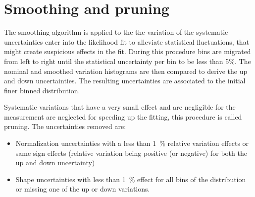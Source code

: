 \section{Smoothing and pruning}
The smoothing algorithm is applied to the the variation of the systematic uncertainties enter into the likelihood fit to alleviate statistical fluctuations, that might create suspicious effects in the fit.
During this procedure bins are migrated from left to right until the statistical uncertainty per bin to be less than 5$\%$. The nominal and smoothed variation histograms are then compared to derive the up and down uncertainties. The resulting uncertainties are associated to the initial finer binned distribution. 

Systematic variations that have a very small effect and are negligible for the measurement are neglected for speeding up the fitting, this procedure is called pruning. 
The uncertainties removed are:
  \begin{itemize}
   \item  Normalization uncertainties with a less than 1~$\%$ relative variation effects or same sign effects (relative variation being positive (or negative) for both the up and down uncertainty)
   \item  Shape uncertainties with less than 1~$\%$ effect for all bins of the distribution or missing one of the up or down variations.
    \end{itemize}


